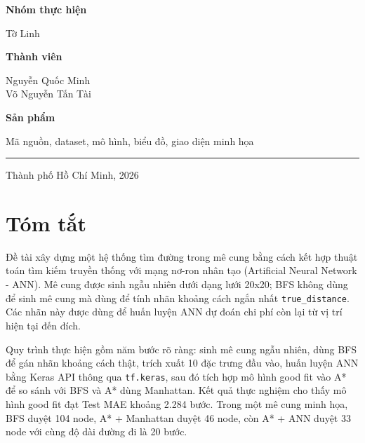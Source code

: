 \documentclass[12pt,a4paper]{article}
\begin{document}
\begin{titlepage}
    \begin{tcolorbox}[
        colback=SoftGray,
        colframe=Primary!75,
        width=0.78\textwidth,
        arc=1mm,
        boxrule=0.7pt,
        left=18pt,
        right=18pt,
        top=12pt,
        bottom=12pt
    ]
        \sffamily
        \newcommand{\coverrow}[2]{%
            \noindent
            \begin{minipage}[t]{0.30\textwidth}
                {\bfseries\color{DarkGray}#1}
            \end{minipage}
            \hfill
            \begin{minipage}[t]{0.64\textwidth}
                #2
            \end{minipage}\par
        }
        \coverrow{Nhóm thực hiện}{Tờ Linh}
        \vspace{0.28cm}
        \coverrow{Thành viên}{Nguyễn Quốc Minh\\[0.18cm]Võ Nguyễn Tấn Tài}
        \vspace{0.28cm}
        \coverrow{Sản phẩm}{Mã nguồn, dataset, mô hình, biểu đồ, giao diện minh họa}
    \end{tcolorbox}

    \vfill
    {\color{Primary}\rule{0.58\textwidth}{0.55pt}\par}
    \vspace{0.22cm}
    {\sffamily\fontsize{12}{15}\selectfont Thành phố Hồ Chí Minh, 2026\par}
\end{titlepage}

\tableofcontents
\newpage

\section*{Tóm tắt}

Đề tài xây dựng một hệ thống tìm đường trong mê cung bằng cách kết hợp thuật toán tìm kiếm truyền thống với mạng nơ-ron nhân tạo (Artificial Neural Network - ANN). Mê cung được sinh ngẫu nhiên dưới dạng lưới 20x20; BFS không dùng để sinh mê cung mà dùng để tính nhãn khoảng cách ngắn nhất \texttt{true\_distance}. Các nhãn này được dùng để huấn luyện ANN dự đoán chi phí còn lại từ vị trí hiện tại đến đích.

Quy trình thực hiện gồm năm bước rõ ràng: sinh mê cung ngẫu nhiên, dùng BFS để gán nhãn khoảng cách thật, trích xuất 10 đặc trưng đầu vào, huấn luyện ANN bằng Keras API thông qua \texttt{tf.keras}, sau đó tích hợp mô hình good fit vào A* để so sánh với BFS và A* dùng Manhattan. Kết quả thực nghiệm cho thấy mô hình good fit đạt Test MAE khoảng 2.284 bước. Trong một mê cung minh họa, BFS duyệt 104 node, A* + Manhattan duyệt 46 node, còn A* + ANN duyệt 33 node với cùng độ dài đường đi là 20 bước.
\end{document}
